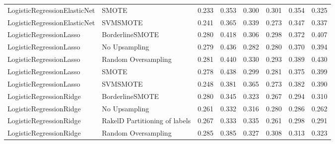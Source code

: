 \begin{tabular}{llllllll}
   LogisticRegressionElasticNet &                         SMOTE & 0.233 &                     0.353 &                 0.300 &                  0.301 &                                   0.354 &     0.325 \\
   LogisticRegressionElasticNet &                      SVMSMOTE & 0.241 &                     0.365 &                 0.339 &                  0.273 &                                   0.347 &     0.337 \\
        LogisticRegressionLasso &               BorderlineSMOTE & 0.280 &                     0.418 &                 0.306 &                  0.298 &                                   0.372 &     0.407 \\
        LogisticRegressionLasso &                 No Upsampling & 0.279 &                     0.436 &                 0.282 &                  0.280 &                                   0.370 &     0.394 \\
        LogisticRegressionLasso &           Random Oversampling & 0.281 &                     0.440 &                 0.330 &                  0.293 &                                   0.389 &     0.430 \\
        LogisticRegressionLasso &                         SMOTE & 0.278 &                     0.438 &                 0.299 &                  0.281 &                                   0.375 &     0.399 \\
        LogisticRegressionLasso &                      SVMSMOTE & 0.248 &                     0.381 &                 0.365 &                  0.273 &                                   0.382 &     0.390 \\
        LogisticRegressionRidge &               BorderlineSMOTE & 0.280 &                     0.345 &                 0.323 &                  0.267 &                                   0.294 &     0.310 \\
        LogisticRegressionRidge &                 No Upsampling & 0.261 &                     0.332 &                 0.316 &                  0.280 &                                   0.286 &     0.262 \\
        LogisticRegressionRidge & RakelD Partitioning of labels & 0.267 &                     0.333 &                 0.335 &                  0.261 &                                   0.298 &     0.291 \\
        LogisticRegressionRidge &           Random Oversampling & 0.285 &                     0.385 &                 0.327 &                  0.308 &                                   0.313 &     0.323 \\

\end{tabular}
